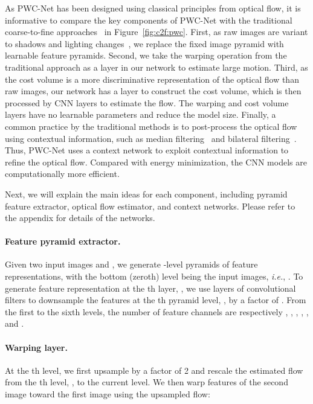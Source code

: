 \documentclass[10pt,journal,cspaper,compsoc]{IEEEtran}
\def\ie{\emph{i.e.}\xspace} \def\Ie{\emph{I.e.}\xspace}
\newcommand{\beforePara}{\vspace{-0em}}
\newcommand{\beforeEqn}{\vspace{-0em}}
\begin{document}
	As PWC-Net has been designed using classical principles from optical flow, it is informative to compare the key components of PWC-Net with the traditional coarse-to-fine approaches~\cite{Black:1996:REMO,Brox:2004:HAO,Horn:1981:DO,Sun:IJCV:2014} in Figure~\ref{fig:c2f:pwc}. First, as raw images are variant to shadows and lighting changes~\cite{Brox:2004:HAO,Sun:IJCV:2014},  we replace the fixed image pyramid with learnable feature pyramids. Second, we take the warping operation from the traditional approach as a layer in our network to estimate large  motion. Third, as the cost volume is a more discriminative representation of the optical flow than raw images, our network has a layer to construct the cost volume, which is then processed by CNN layers to estimate the flow. The warping and cost volume layers have no learnable parameters and  reduce the model size. Finally, a common practice by the traditional methods is to post-process the optical flow  using contextual information, such as median filtering~\cite{Wedel:2008:ITVL1} and bilateral filtering~\cite{Xiao:2006:BFO}. Thus, PWC-Net uses a context network to exploit contextual information to refine the optical flow. Compared with energy minimization, the CNN models are computationally more efficient. 
	
	Next, we will explain the main ideas for each component, including pyramid feature extractor, optical flow estimator, and context networks. Please refer to the appendix for details of the networks. 
	
	
	
	\beforePara
	\paragraph{Feature pyramid extractor.}	Given two input images  and , we generate -level pyramids of feature representations, with the bottom (zeroth) level being the input images, \ie,  .  
	To generate feature representation at the th layer, , we use layers of convolutional filters to downsample the features at the th pyramid level,  , by a factor of .
	From the first to the sixth levels, the number of feature channels are respectively , , , , , and . 
	
	\beforePara
	\paragraph{Warping layer.} At the th level, we first upsample by a factor of 2 and rescale the estimated flow from the th level, , to the current level. We then  warp features of the second image toward the first image using the upsampled flow: \beforeEqn
	
\end{document}

